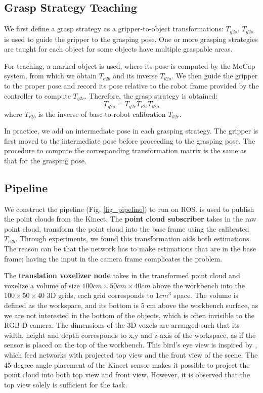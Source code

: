 \documentclass[conference]{IEEEtran}
\begin{document}
\subsection{Grasp Strategy Teaching}
We first define a grasp strategy as a gripper-to-object transformations: $T_{g2o}$. $T_{g2o}$ is used to guide the gripper to the grasping pose. One or more grasping strategies are taught for each object for some objects have multiple graspable areas.

For teaching, a marked object is used, where its pose is computed by the MoCap system, from which we obtain $T_{o2b}$ and its inverse $T_{b2o}$. We then guide the gripper to the proper pose and record its pose relative to the robot frame provided by the controller to compute $T_{g2r}$. Therefore, the grasp strategy is obtained:
$$T_{g2o} = T_{g2r}T_{r2b}T_{b2o}$$
where $T_{r2b}$ is the inverse of base-to-robot calibration $T_{b2r}$.

In practice, we add an intermediate pose in each grasping strategy. The gripper is first moved to the intermediate pose before proceeding to the grasping pose. The procedure to compute the corresponding transformation matrix is the same as that for the grasping pose.

\subsection{Pipeline}
We construct the pipeline (Fig. \ref{fig_pipeline}) to run on ROS. \cite{iai_kinect2} is used to publish the point clouds from the Kinect. The \textbf{point cloud subscriber} takes in the raw point cloud, transform the point cloud into the base frame using the calibrated $T_{c2b}$. Through experiments, we found this transformation aids both estimations. The reason can be that the network has to make estimations that are in the base frame; having the input in the camera frame complicates the problem.

The \textbf{translation voxelizer node} takes in the transformed point cloud and voxelize a volume of size $100 cm\times50 cm\times40 cm$ above the workbench into the $100\times50\times40$ 3D grids, each grid corresponds to $1 cm^{3}$ space. The volume is defined as the workspace, and its bottom is 5 cm above the workbench surface, as we are not interested in the bottom of the objects, which is often invisible to the RGB-D camera. The dimensions of the 3D voxels are arranged such that its width, height and depth corresponds to x,y and z-axis of the workspace, as if the sensor is placed on the top of the workbench. This bird's eye view is inspired by \cite{chen_2017_cvpr}, which feed networks with projected top view and the front view of the scene. The 45-degree angle placement of the Kinect sensor makes it possible to project the point cloud into both top view and front view. However, it is observed that the top view solely is sufficient for the task.
\end{document}
